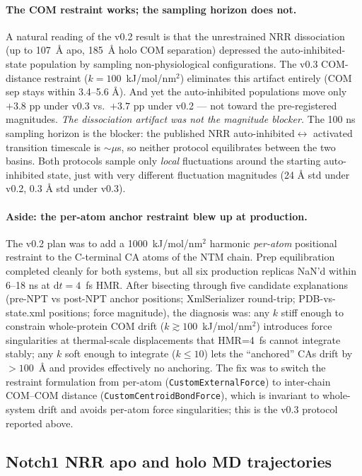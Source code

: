 \documentclass[11pt]{article}
\begin{document}
\paragraph{The COM restraint works; the sampling horizon does not.}
A natural reading of the v0.2 result is that the unrestrained NRR
dissociation (up to 107~\AA{} apo, 185~\AA{} holo COM separation)
depressed the auto-inhibited-state population by sampling
non-physiological configurations. The v0.3 COM-distance restraint
($k=100$~kJ/mol/nm$^2$) eliminates this artifact entirely
(COM sep stays within 3.4--5.6 \AA{}). And yet the auto-inhibited
populations move only $+3.8$ pp under v0.3 vs.\ $+3.7$ pp under v0.2
--- not toward the pre-registered magnitudes. \emph{The dissociation
artifact was not the magnitude blocker.} The 100 ns sampling horizon
is the blocker: the published NRR auto-inhibited$\leftrightarrow$
activated transition timescale is $\sim$$\mu$s, so neither protocol
equilibrates between the two basins. Both protocols sample only
\emph{local} fluctuations around the starting auto-inhibited state,
just with very different fluctuation magnitudes (24 \AA{} std under
v0.2, 0.3 \AA{} std under v0.3).

\paragraph{Aside: the per-atom anchor restraint blew up at
production.} The v0.2 plan was to add a 1000~kJ/mol/nm$^2$ harmonic
\emph{per-atom} positional restraint to the C-terminal CA atoms of
the NTM chain. Prep equilibration completed cleanly for both
systems, but all six production replicas NaN'd within 6--18 ns at
$\text{d}t = 4$~fs HMR. After bisecting through five candidate
explanations (pre-NPT vs post-NPT anchor positions; XmlSerializer
round-trip; PDB-vs-state.xml positions; force magnitude), the
diagnosis was: any $k$ stiff enough to constrain whole-protein COM
drift ($k \gtrsim 100$~kJ/mol/nm$^2$) introduces force singularities
at thermal-scale displacements that HMR=4~fs cannot integrate
stably; any $k$ soft enough to integrate ($k \le 10$) lets the
``anchored'' CAs drift by $> 100$~\AA{} and provides effectively no
anchoring. The fix was to switch the restraint formulation from
per-atom (\texttt{CustomExternalForce}) to inter-chain COM--COM
distance (\texttt{CustomCentroidBondForce}), which is invariant to
whole-system drift and avoids per-atom force singularities; this
is the v0.3 protocol reported above.

\subsection{Notch1 NRR apo and holo MD trajectories}
\label{sec:notch1_traj}
\end{document}
